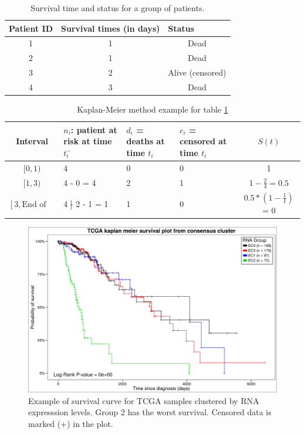 \begin{table}[h!]
\centering
\caption[Survival time example]{Survival time and status for a group of patients.}
\label{survival-example}
\begin{tabular}{ccc}
\hline
\multicolumn{1}{l}{\textbf{Patient ID}} & \multicolumn{1}{l}{\textbf{Survival times (in days)}} & \multicolumn{1}{l}{\textbf{Status}} \\ \hline
1 & 1 & Dead \\
2 & 1 & Dead \\
3 & 2 & Alive (censored) \\
4 & 3 & Dead \\ \hline
\end{tabular}
\end{table}

\begin{table}[h!]
\centering
\caption[Kaplan-Meier method example]{Kaplan-Meier method example for table \ref{survival-example}}
\label{Kaplan-Meier-example}
\begin{tabular}{cp{3cm}p{3cm}p{3cm}c}
\hline
\textbf{Interval} & \textbf{$n_i$: patient at risk at time $t_i^-$} &
\textbf{$d_i$ = deaths at time $t_i$} &
\textbf{$c_i$ = censored at time $t_i$} &  \textbf{$S(t)$}  \\ \hline
$[0,1)$ & 4          & 0 & 0 & 1 \\
$[1,3)$ & 4 - 0 = 4  & 2 & 1 & $1 - \frac{2}{4} = 0.5$ \\
$[3,\textrm{End of study}]$  & 4 - 2 - 1 = 1  & 1 & 0 & $0.5 * (1 - \frac{1}{1})$ = 0 \\ \hline
\end{tabular}
\end{table}


\begin{figure}
\centering
\includegraphics[width=1.0\linewidth]{images/example_survival.png}
\caption[Example of survival curve.]{\label{fig:survival_example}
Example of survival curve for TCGA samples clustered by RNA expresssion levels. Group 2 has
the worst survival. Censored data is marked (+) in the plot.}
\end{figure}



